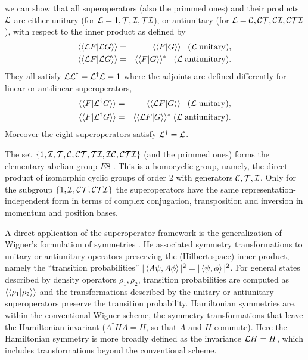 %
we can show that all superoperators (also the primmed ones) and their products ${\cal L}$ are either unitary (for ${\cal L}=1,{\cal T},{\cal I},{\cal TI}$), or antiunitary (for ${\cal L}={\cal C}, {\cal CT},{\cal CI},{\cal CTI}$), with respect to the inner product as defined by
%
\begin{eqnarray}
	\langle\langle {\cal L}F| {\cal L}G\rangle\rangle&=& \langle\langle F| G\rangle\rangle\;\;\;  ({\cal L}\; {\rm unitary}),
	\\
	\langle\langle {\cal L}F| {\cal L} G\rangle\rangle&=& \langle\langle  F| G\rangle\rangle^*\;\;\;  ({\cal L}\; {\rm antiunitary}).
\end{eqnarray}
%
They all satisfy ${\cal L}{\cal L}^\dagger={\cal L}^\dagger {\cal L}=1$
where the adjoints are defined differently for linear or antilinear superoperators,
\begin{eqnarray}
	\langle\langle F| {\cal L}^\dagger G\rangle\rangle&=& \langle\langle {\cal L} F| G\rangle\rangle\;\;\;  ({\cal L}\; {\rm unitary}),
	\\
	\langle\langle F| {\cal L}^\dagger G\rangle\rangle&=& \langle\langle {\cal L} F| G\rangle\rangle^*\;  ({\cal L}\; {\rm antiunitary}).
\end{eqnarray}
%
Moreover the eight superoperators  satisfy ${\cal L}^\dagger={\cal L}$.

The set $\{1, \cal{I,T,C,CT,TI,IC,CTI}\}$ (and the primmed ones) forms the elementary abelian group $E8$ \cite{Rose2009}. This is a homocyclic group, namely, the direct product of isomorphic
cyclic groups of order 2 with generators $\cal{C,T,I}$. Only for the subgroup $\{1, \cal{I,CT,CTI}\}$ the superoperators have the same representation-independent form in terms of complex conjugation, transposition and inversion in momentum and position bases.

A direct application of the superoperator framework is the generalization of Wigner's
formulation of symmetries \cite{Wigner1959}. He associated symmetry transformations to unitary or antiunitary operators preserving the (Hilbert space) inner product, namely the ``transition probabilities'' $|\expval{A\psi,A\phi}|^2=|\expval{\psi,\phi}|^2$.
For general states described by density operators $\rho_1,\rho_2$, transition probabilities are computed as $\langle\langle \rho_1|\rho_2\rangle\rangle$
and the transformations described by the unitary or antiunitary superoperators preserve the
transition probability. Hamiltonian symmetries are, within the conventional Wigner scheme, the  symmetry transformations that leave the Hamiltonian invariant ($A^\dagger H A=H$, so that $A$ and $H$ commute). Here the Hamiltonian symmetry is more broadly defined  as
the invariance ${\cal L}H=H$, which includes transformations  beyond the conventional scheme.

